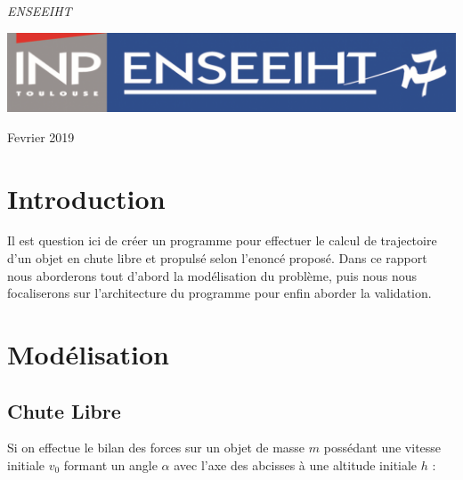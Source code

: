 \documentclass[a4paper,oneside]{article}
\begin{document}
\begin{titlepage}
	\vspace{0.5\baselineskip} %

	\textit{ENSEEIHT} %

	\vfill %


	\includegraphics[scale=0.3]{logoN7.png} %

	\vspace{0.3\baselineskip} %

Fevrier 2019 %



\end{titlepage}
\newpage

\tableofcontents
\newpage



\section{Introduction}
Il est question ici de créer un programme pour effectuer le calcul de trajectoire d'un objet en chute libre et propulsé selon l'enoncé proposé.
Dans ce rapport nous aborderons tout d'abord la modélisation du problème, puis nous nous focaliserons sur l'architecture du programme pour enfin aborder la validation.

\section{Modélisation}

\subsection{Chute Libre}

Si on effectue le bilan des forces sur un objet de masse $m$ possédant une vitesse initiale $v_0$ formant un angle $\alpha$ avec l'axe des abcisses à une altitude initiale $h$ :
\end{document}
